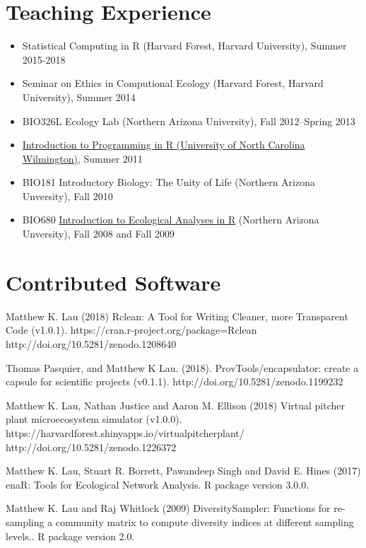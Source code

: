 \documentclass[a4paper]{article}
\begin{document}
\section{Teaching Experience}\label{teaching-experience}

\begin{itemize}
\item
  Statistical Computing in R (Harvard Forest, Harvard
  University), Summer 2015-2018
\item
  Seminar on Ethics in Computional Ecology (Harvard Forest, Harvard
  University), Summer 2014
\item
  BIO326L Ecology Lab (Northern Arizona University), Fall 2012--Spring
  2013
\item
  \href{http://people.uncw.edu/borretts/courses/RworkshopUNCW.pdf}{Introduction
  to Programming in R (University of North Carolina Wilmington)}, Summer
  2011
\item
  BIO181 Introductory Biology: The Unity of Life (Northern Arizona
  Unversity), Fall 2010
\item
  BIO680
  \href{http://www.mpcer.nau.edu/igert/eco_analysis_r.html}{Introduction
  to Ecological Analyses in R} (Northern Arizona Unversity), Fall 2008
  and Fall 2009
\end{itemize}

\section{Contributed Software}\label{contributed-software}

{Matthew K. Lau (2018) Rclean: A Tool for Writing Cleaner, more
  Transparent Code (v1.0.1). https://cran.r-project.org/package=Rclean
  http://doi.org/10.5281/zenodo.1208640}

{Thomas Pasquier, and Matthew K Lau. (2018). ProvTools/encapsulator:
  create a capsule for scientific projects
  (v0.1.1). http://doi.org/10.5281/zenodo.1199232}

{Matthew K. Lau, Nathan Justice and Aaron M. Ellison (2018) Virtual
  pitcher plant microecosystem simulator
  (v1.0.0). https://harvardforest.shinyapps.io/virtualpitcherplant/
  http://doi.org/10.5281/zenodo.1226372}

{Matthew K. Lau, Stuart R. Borrett, Pawandeep Singh and David E. Hines
  (2017) enaR: Tools for Ecological Network Analysis. R package
  version 3.0.0.}

{Matthew K. Lau and Raj Whitlock (2009) DiversitySampler: Functions
  for re-sampling a community matrix to compute diversity indices at
  different sampling levels.. R package version 2.0.}
\end{document}
